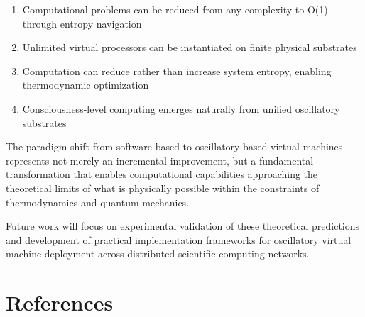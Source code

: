 \documentclass[12pt,a4paper]{article}
\begin{document}
\begin{enumerate}
\item Computational problems can be reduced from any complexity to O(1) through entropy navigation
\item Unlimited virtual processors can be instantiated on finite physical substrates
\item Computation can reduce rather than increase system entropy, enabling thermodynamic optimization
\item Consciousness-level computing emerges naturally from unified oscillatory substrates
\end{enumerate}

The paradigm shift from software-based to oscillatory-based virtual machines represents not merely an incremental improvement, but a fundamental transformation that enables computational capabilities approaching the theoretical limits of what is physically possible within the constraints of thermodynamics and quantum mechanics.

Future work will focus on experimental validation of these theoretical predictions and development of practical implementation frameworks for oscillatory virtual machine deployment across distributed scientific computing networks.

\section{References}
\end{document}

